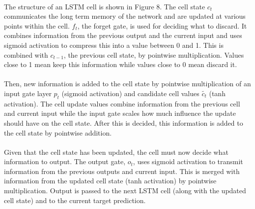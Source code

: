 \documentclass[11pt]{article}
\begin{document}
                    \begin{multicols*}{2}

                    \paragraph{}
                        The structure of an LSTM cell is shown in Figure 8.
                        The cell state $c_t$ communicates the long term memory of the network and are updated at various points within the cell.  
                        $f_t$, the forget gate, is used for deciding what to discard.
                        It combines information from the previous output and the current input and uses sigmoid activation to compress this into a value between 0 and 1.
                        This is combined with $c_{t-1}$, the previous cell state, by pointwise multiplication.
                        Values close to 1 mean keep this information while values close to 0 mean discard it. 
                        
                    \vspace{-10pt}

                    \paragraph{}
                        Then, new information is added to the cell state by pointwise multiplication of an input gate layer $p_t$ (sigmoid activation) and candidate cell values $\tilde{c_t}$ (tanh activation).
                        The cell update values combine information from the previous cell and current input while the input gate scales how much influence the update should have on the cell state.
                        After this is decided, this information is added to the cell state by pointwise addition.

                    \vspace{-10pt}

                    \paragraph{}
                        Given that the cell state has been updated, the cell must now decide what information to output.
                        The output gate, $o_t$, uses sigmoid activation to transmit information from the previous outputs and current input.
                        This is merged with information from the updated cell state (tanh activation) by pointwise multiplication.
                        Output is passed to the next LSTM cell (along with the updated cell state) and to the current target prediction.
                        

\end{multicols*}
\end{document}
